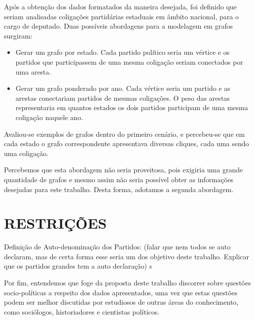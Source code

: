 Após a obtenção dos dados formatados da maneira desejada, foi definido que seriam analisadas coligações partidárias estaduais em âmbito nacional, para o cargo de deputado. Duas possíveis abordagens para a modelagem em grafos surgiram:
\begin{itemize}
    \item Gerar um grafo por estado. Cada partido político seria um vértice e os partidos que participassem de uma mesma coligação seriam conectados por uma aresta.
    \item Gerar um grafo ponderado por ano. Cada vértice seria um partido e as arestas conectariam partidos de mesmas coligações. O peso das arestas representaria em quantos estados os dois partidos participam de uma mesma coligação naquele ano.
\end{itemize}


Avaliou-se exemplos de grafos dentro do primeiro cenário, e percebeu-se que em cada estado o grafo correspondente apresentava diversas cliques, cada uma sendo uma coligação.


Percebemos que esta abordagem não seria proveitosa, pois exigiria uma grande quantidade de grafos e mesmo assim não seria possível obter as informações desejadas para este trabalho. Desta forma, adotamos a segunda abordagem.

\section{\texorpdfstring{\MakeUppercase{Restrições}}{}}
\label{secao_objetivo_geral}


Definição de Auto-denominação dos Partidos: (falar que nem todos se auto declaram, mas de certa forma esse seria um dos objetivo deste trabalho. Explicar que os partidos grandes tem a auto declaração)
s


Por fim, entendemos que foge da proposta deste trabalho discorrer sobre questões socio-políticas a respeito dos dados apresentados, uma vez que estas questões podem ser melhor discutidas por estudiosos de outras áreas do conhecimento, como sociólogos, historiadores e cientistas políticos.

